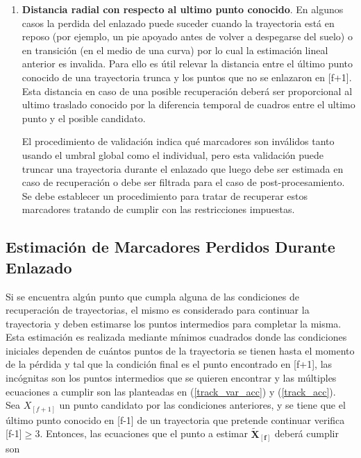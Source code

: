 \begin{itemize}
\begin{enumerate}
  \item \textbf{Distancia radial con respecto al ultimo punto conocido}. En algunos casos la perdida del enlazado puede suceder cuando la trayectoria está en reposo (por ejemplo, un pie apoyado antes de volver a despegarse del suelo) o en transición (en el medio de una curva) por lo cual la estimación lineal anterior es invalida. Para ello es útil relevar la distancia entre el último punto conocido de una trayectoria trunca y los puntos que no se enlazaron en [f+1]. Esta distancia en caso de una posible recuperación deberá ser proporcional al ultimo traslado conocido por la diferencia temporal de cuadros entre el ultimo punto y el posible candidato.
 
El procedimiento de validación indica qué marcadores son inválidos tanto usando el umbral global como el individual, pero esta validación puede truncar una trayectoria durante el enlazado que luego debe ser estimada en caso de recuperación o debe ser filtrada para el caso de post-procesamiento. Se debe establecer un procedimiento para tratar de recuperar estos marcadores tratando de cumplir con las restricciones impuestas.
 
  
\end{enumerate} 

\end{itemize}

\subsection{Estimación de Marcadores Perdidos Durante Enlazado}

Si se encuentra algún punto que cumpla alguna de las condiciones de recuperación de trayectorias, el mismo es considerado para continuar la trayectoria y deben estimarse los puntos intermedios para completar la misma.
\\ 

Esta estimación es realizada mediante mínimos cuadrados donde las condiciones iniciales dependen de cuántos puntos de la trayectoria se tienen hasta el momento de la pérdida y tal que la condición final es el punto encontrado en [f+1], las incógnitas son los puntos intermedios que se quieren encontrar y las múltiples ecuaciones a cumplir son las planteadas en (\ref{track_var_acc}) y (\ref{track_acc}).
\\ 

Sea $X_{[f+1]}$ un punto candidato por las condiciones anteriores, y se tiene que el último punto conocido en [f-1] de un trayectoria que pretende continuar verifica [f-1]$\geq$3. Entonces, las ecuaciones que el punto a estimar $\boldsymbol{\tilde{X}_{[f]}}$ deberá cumplir son


